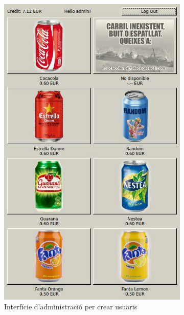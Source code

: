 \begin{figure}[H]
	\centering
	\begin{subfigure}[b]{0.45\textwidth}
		\includegraphics[width=\textwidth]{images/client_app1}
		\caption{Interfície d'administració per crear usuaris}
		\label{fig:client-app1}
	\end{subfigure}
	\hspace{0.5cm}
	\begin{subfigure}[b]{0.45\textwidth}

\end{subfigure}
\end{figure}
